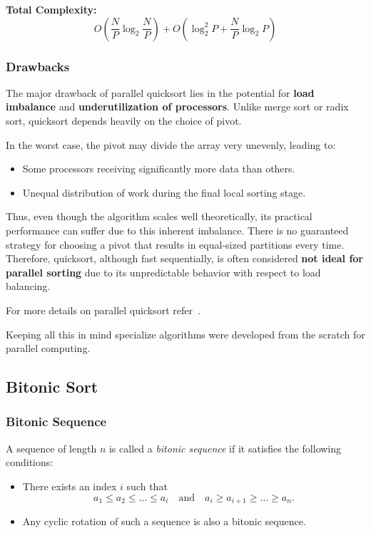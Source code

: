\documentclass[12pt]{book}
\begin{document}
\textbf{Total Complexity:}
\[
O\left(\frac{N}{P} \log_2 \frac{N}{P}\right) + O\left(\log_2^2 P + \frac{N}{P} \log_2 P\right)
\]

\subsubsection*{Drawbacks}

The major drawback of parallel quicksort lies in the potential for \textbf{load imbalance} and \textbf{underutilization of processors}. Unlike merge sort or radix sort, quicksort depends heavily on the choice of pivot.

In the worst case, the pivot may divide the array very unevenly, leading to:
\begin{itemize}
    \item Some processors receiving significantly more data than others.
    \item Unequal distribution of work during the final local sorting stage.
\end{itemize}

Thus, even though the algorithm scales well theoretically, its practical performance can suffer due to this inherent imbalance. There is no guaranteed strategy for choosing a pivot that results in equal-sized partitions every time. Therefore, quicksort, although fast sequentially, is often considered \textbf{not ideal for parallel sorting} due to its unpredictable behavior with respect to load balancing.

For more details on parallel quicksort refer~\cite{kumar1994introduction}.

Keeping all this in mind specialize algorithms were developed from the scratch for parallel computing.


\subsection{Bitonic Sort}

\subsubsection{Bitonic Sequence}
A sequence of length $n$ is called a \emph{bitonic sequence} if it satisfies the following conditions:
\begin{itemize}
    \item There exists an index $i$ such that
    \[
    a_1 \leq a_2 \leq \ldots \leq a_i \quad \text{and} \quad a_i \geq a_{i+1} \geq \ldots \geq a_n.
    \]
    \item Any cyclic rotation of such a sequence is also a bitonic sequence.
\end{itemize}
\end{document}
